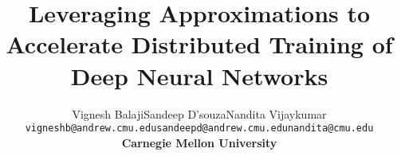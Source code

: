 \documentclass[pageno]{jpaper}
\begin{document}
\title{Leveraging Approximations to Accelerate Distributed Training of \\ Deep Neural Networks}

\DeclareRobustCommand{\authorthing}{
\begin{tabular}[t]{ccc}
Vignesh Balaji & Sandeep D'souza & Nandita Vijaykumar \\
\texttt{vigneshb@andrew.cmu.edu} & \texttt{sandeepd@andrew.cmu.edu} & \texttt{nandita@cmu.edu}\\
\multicolumn{3}{c}{\textbf{Carnegie Mellon University}}
\end{tabular}
}
\author{\authorthing}

\date{}
\maketitle
\let\oldtabular\tabular
\renewcommand{\tabular}{\footnotesize\oldtabular}

\thispagestyle{empty}














\end{document}
